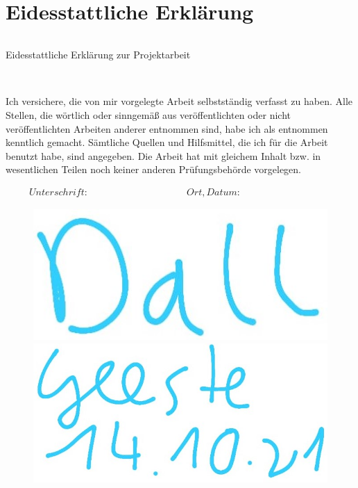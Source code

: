 \section*{Eidesstattliche Erklärung}
\thispagestyle{empty}

\begin{verbatim}

\end{verbatim}

\begin{LARGE}Eidesstattliche Erklärung zur Projektarbeit\end{LARGE}
\begin{verbatim}


\end{verbatim}
Ich versichere, die von mir vorgelegte Arbeit selbstständig verfasst zu haben. Alle Stellen, die wörtlich oder sinngemäß aus veröffentlichten oder nicht veröffentlichten Arbeiten anderer entnommen sind, habe ich als entnommen kenntlich gemacht. Sämtliche Quellen und Hilfsmittel, die ich für die Arbeit benutzt habe, sind angegeben. Die Arbeit hat mit gleichem Inhalt bzw. in wesentlichen Teilen noch keiner anderen Prüfungsbehörde vorgelegen.



\begin{displaymath}
\begin{array}{ll}
Unterschrift:~~~~~~~~~~~~~~~~~~~~~~~~~~~~~~~~~~~~~~~~~~
& Ort, Datum:~~~~~~~~~~~~~~~~~~~~~~~~~~~~~~~~~~~~~~~~~~
\end{array}
\end{displaymath}

\begin{figure}[h]
	\begin{minipage}[b]{.4\linewidth} %
	\includegraphics[width=0.7\linewidth]{abb/unterschrift}
	\end{minipage}
	\hspace{.1\linewidth}%
	\begin{minipage}[b]{.4\linewidth} %
	\includegraphics[width=0.6\linewidth]{abb/ort}
	\end{minipage}
\end{figure}




